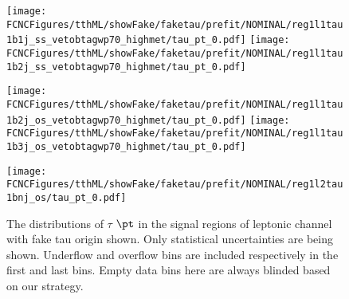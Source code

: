 \begin{figure}[H]
\centering
\caption{ The distributions of $\tau$ $\pt$ in the signal regions of leptonic channel with fake tau origin shown. Only statistical uncertainties are being shown. Underflow and overflow bins are included respectively in the first and last bins. Empty data bins here are always blinded based on our strategy.}
\texttt{[image: \\FCNCFigures/tthML/showFake/faketau/prefit/NOMINAL/reg1l1tau1b1j\_ss\_vetobtagwp70\_highmet/tau\_pt\_0.pdf]}
\texttt{[image: \\FCNCFigures/tthML/showFake/faketau/prefit/NOMINAL/reg1l1tau1b2j\_ss\_vetobtagwp70\_highmet/tau\_pt\_0.pdf]}

\texttt{[image: \\FCNCFigures/tthML/showFake/faketau/prefit/NOMINAL/reg1l1tau1b2j\_os\_vetobtagwp70\_highmet/tau\_pt\_0.pdf]}
\texttt{[image: \\FCNCFigures/tthML/showFake/faketau/prefit/NOMINAL/reg1l1tau1b3j\_os\_vetobtagwp70\_highmet/tau\_pt\_0.pdf]}

\texttt{[image: \\FCNCFigures/tthML/showFake/faketau/prefit/NOMINAL/reg1l2tau1bnj\_os/tau\_pt\_0.pdf]}
\label{fig:wjet_pt}
\end{figure}
